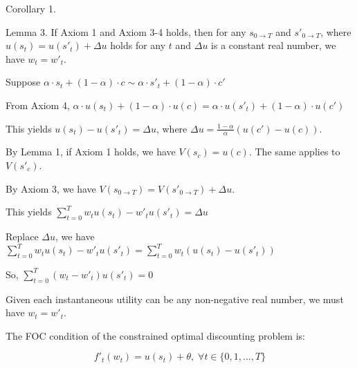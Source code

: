 \documentclass[
  12pt,
]{article}
\begin{document}
Corollary 1.

Lemma 3. If Axiom 1 and Axiom 3-4 holds, then for any
\(s_{0\rightarrow T}\) and \(s'_{0\rightarrow T}\), where
\(u(s_t)= u(s'_t)+\Delta u\) holds for any \(t\) and \(\Delta u\) is a
constant real number, we have \(w_t=w'_t\).

Suppose
\(\alpha \cdot s_t+(1-\alpha)\cdot c\sim\alpha \cdot s'_t+(1-\alpha)\cdot c'\)

From Axiom 4,
\(\alpha \cdot u(s_t)+(1-\alpha)\cdot u(c)=\alpha \cdot u(s'_t)+(1-\alpha)\cdot u(c')\)

This yields \(u(s_t)-u(s'_t)=\Delta u\), where
\(\Delta u=\frac{1-\alpha}{\alpha} (u(c')-u(c))\).

By Lemma 1, if Axiom 1 holds, we have \(V(s_c)=u(c)\). The same applies
to \(V(s'_c)\).

By Axiom 3, we have
\(V(s_{0\rightarrow T})=V(s'_{0\rightarrow T})+\Delta u\).

This yields \(\sum_{t=0}^T w_tu(s_t)- w'_tu(s'_t)=\Delta u\)

Replace \(\Delta u\), we have
\(\sum_{t=0}^T w_tu(s_t)- w'_tu(s'_t)=\sum_{t=0}^T w_t(u(s_t)- u(s'_t))\)

So, \(\sum_{t=0}^T (w_t-w'_t) u(s'_t)=0\)

Given each instantaneous utility can be any non-negative real number, we
must have \(w_t=w'_t\).

The FOC condition of the constrained optimal discounting problem is:

\[
f'_t(w_t)=u(s_t)+\theta,\; \forall t\in\{0,1,...,T\}
\]

  
\end{document}
